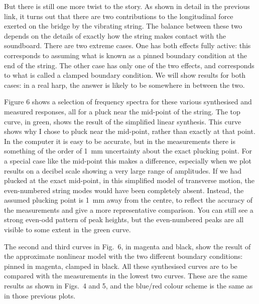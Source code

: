   But there is still one more twist to the story. As shown in detail in the 
  previous link, it turns out that there are two contributions to the 
  longitudinal force exerted on the bridge by the vibrating string. The balance 
  between these two depends on the details of exactly how the string makes 
  contact with the soundboard. There are two extreme cases. One has both 
  effects fully active: this corresponds to assuming what is known as a pinned 
  boundary condition at the end of the string. The other case has only one of 
  the two effects, and corresponds to what is called a clamped boundary 
  condition. We will show results for both cases: in a real harp, the answer is 
  likely to be somewhere in between the two. 

  Figure 6 shows a selection of frequency spectra for these various synthesised 
  and measured responses, all for a pluck near the mid-point of the string. The 
  top curve, in green, shows the result of the simplified linear synthesis. 
  This curve shows why I chose to pluck near the mid-point, rather than exactly 
  at that point. In the computer it is easy to be accurate, but in the 
  measurements there is something of the order of 1~mm uncertainty about the 
  exact plucking point. For a special case like the mid-point this makes a 
  difference, especially when we plot results on a decibel scale showing a very 
  large range of amplitudes. If we had plucked at the exact mid-point, in this 
  simplified model of transverse motion, the even-numbered string modes would 
  have been completely absent. Instead, the assumed plucking point is 1~mm away 
  from the centre, to reflect the accuracy of the measurements and give a more 
  representative comparison. You can still see a strong even-odd pattern of 
  peak heights, but the even-numbered peaks are all visible to some extent in 
  the green curve. 

  The second and third curves in Fig.\ 6, in magenta and black, show the result 
  of the approximate nonlinear model with the two different boundary 
  conditions: pinned in magenta, clamped in black. All these synthesised curves 
  are to be compared with the measurements in the lowest two curves. These are 
  the same results as shown in Figs.\ 4 and 5, and the blue/red colour scheme 
  is the same as in those previous plots. 


